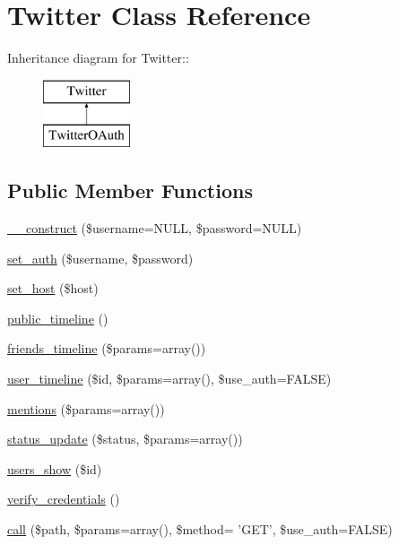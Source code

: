 \hypertarget{classTwitter}{
\section{Twitter Class Reference}
\label{classTwitter}
}
Inheritance diagram for Twitter::\begin{figure}[H]
\begin{center}
\leavevmode
\includegraphics[height=2cm]{classTwitter}
\end{center}
\end{figure}
\subsection*{Public Member Functions}
\begin{CompactItemize}
\item 
\hyperlink{classTwitter_27a3a1498c3269a212e5907ffa8c6feb}{\_\-\_\-construct} (\$username=NULL, \$password=NULL)
\item 
\hyperlink{classTwitter_1f858ac6fd8c8f3ed4188435ad51957c}{set\_\-auth} (\$username, \$password)
\item 
\hyperlink{classTwitter_9a4bb9d8731491784df32c6f864a7cb9}{set\_\-host} (\$host)
\item 
\hyperlink{classTwitter_d510f44c049b383baef399f40fe46af5}{public\_\-timeline} ()
\item 
\hyperlink{classTwitter_b71b8679389a26cbba74c0b89c896dea}{friends\_\-timeline} (\$params=array())
\item 
\hyperlink{classTwitter_c551ee66261993a6722f1e056f0b3b1f}{user\_\-timeline} (\$id, \$params=array(), \$use\_\-auth=FALSE)
\item 
\hyperlink{classTwitter_f8edee3b3dd9cd0f689b10e35562351f}{mentions} (\$params=array())
\item 
\hyperlink{classTwitter_6f43168e0afff59d45a1ffc5db30d328}{status\_\-update} (\$status, \$params=array())
\item 
\hyperlink{classTwitter_b075baa3b9b5ac1dae324db84025d0af}{users\_\-show} (\$id)
\item 
\hyperlink{classTwitter_d66adb8eb0c9d1d6bd7b7b87045fd314}{verify\_\-credentials} ()
\item 
\hyperlink{classTwitter_0e92b39735606e39b14634ece323481f}{call} (\$path, \$params=array(), \$method= 'GET', \$use\_\-auth=FALSE)
\end{CompactItemize}
